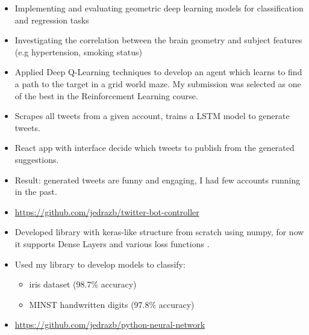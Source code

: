 \begin{itemize}
\item Implementing and evaluating geometric deep learning models for classification and regression tasks
\item Investigating the correlation between the brain geometry and subject features (e.g hypertension, smoking status) 
\end{itemize}
\smallskip
{}
\begin{itemize}
    \item Applied Deep Q-Learning techniques to develop an agent which learns to find a path to the target in a grid world maze. My submission was selected as one of the best in the Reinforcement Learning course.
\end{itemize}
\smallskip
{}
\begin{itemize}
\item Scrapes all tweets from a given account, trains a LSTM model to generate tweets.
\item React app with interface decide which tweets to publish from the generated suggestions.
\item Result: generated tweets are funny and engaging, I had few accounts running in the past.
\item \href{https://github.com/jedrazb/twitter-bot-controller}{https://github.com/jedrazb/twitter-bot-controller}
\end{itemize}
\smallskip
{}
\begin{itemize}
\item Developed library with keras-like structure from scratch using numpy, for now it supports Dense Layers and various loss functions .
\item Used my library to develop models to classify:
\smallskip
\begin{itemize}
    \item iris dataset (98.7\% accuracy)
    \item MINST handwritten digits (97.8\% accuracy)
\end{itemize}
\item \href{https://github.com/jedrazb/python-neural-network}{https://github.com/jedrazb/python-neural-network}
\end{itemize}
